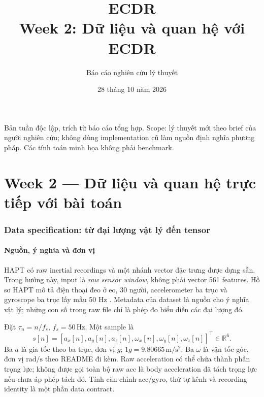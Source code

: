 \documentclass[11pt,a4paper]{article}
\newcommand{\R}{\mathbb R}
\theoremstyle{remark}
\begin{document}
\title{\textcolor{ink}{ECDR}\\[5pt]\Large Week 2: Dữ liệu và quan hệ với ECDR}
\author{Báo cáo nghiên cứu lý thuyết}
\date{28 tháng 10 năm 2026}
\maketitle
\noindent Bản tuần độc lập, trích từ báo cáo tổng hợp. Scope: lý thuyết mới
theo brief của người nghiên cứu; không dùng implementation cũ làm nguồn
định nghĩa phương pháp. Các tính toán minh họa không phải benchmark.
\tableofcontents
\clearpage
\part{Week 2 --- Dữ liệu và quan hệ trực tiếp với bài toán}
\section{Data specification: từ đại lượng vật lý đến tensor}
\subsection{Nguồn, ý nghĩa và đơn vị}
HAPT có raw inertial recordings và một nhánh vector đặc trưng được dựng sẵn.
Trong hướng này, input là \emph{raw sensor window}, không phải vector
561 features. Hồ sơ HAPT mô tả điện thoại đeo ở eo, 30 người, accelerometer
ba trục và gyroscope ba trục lấy mẫu 50 Hz \cite{hapt}. Metadata của dataset
là nguồn cho ý nghĩa vật lý; những con số trong raw file chỉ là phép đo
biểu diễn các đại lượng đó.

Đặt $\tau_n=n/f_s$, $f_s=50\,\mathrm{Hz}$. Một sample là
\begin{equation}
 s[n]=[a_x[n],a_y[n],a_z[n],\omega_x[n],\omega_y[n],\omega_z[n]]^\top
 \in\R^6.
 \label{eq:sample}
\end{equation}
Ba $a$ là gia tốc theo ba trục, đơn vị $g$; $1g=9.80665\,\mathrm{m/s^2}$.
Ba $\omega$ là vận tốc góc, đơn vị $\mathrm{rad/s}$ theo README đi kèm.
Raw acceleration có thể chứa thành phần trọng lực; không được gọi toàn bộ
raw acc là body acceleration đã tách trọng lực nếu chưa áp phép tách đó.
Tính căn chỉnh acc/gyro, thứ tự kênh và recording identity là một phần data
contract.
\end{document}
